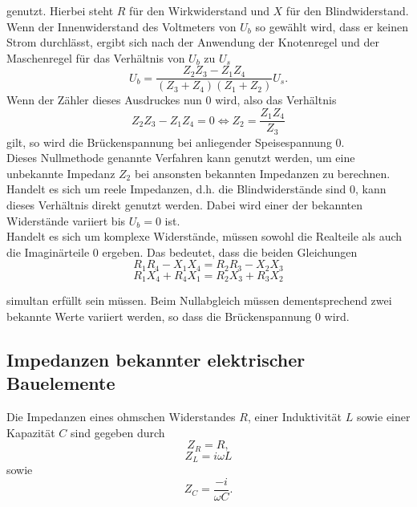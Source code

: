 genutzt.
Hierbei steht $R$ für den Wirkwiderstand und $X$ für den Blindwiderstand. \\
Wenn der Innenwiderstand des Voltmeters von $U_b$ so gewählt wird, dass er keinen Strom durchlässt, ergibt sich nach der Anwendung der Knotenregel und der Maschenregel für das Verhältnis von $U_b$ zu $U_s$
\begin{equation}
  U_b = \frac{Z_2 Z_3 - Z_1 Z_4}{(Z_3 + Z_4)(Z_1 + Z_2)}U_s.
\end{equation}
Wenn der Zähler dieses Ausdruckes nun 0 wird, also das Verhältnis
\begin{equation}
Z_2 Z_3 - Z_1 Z_4 = 0 \iff Z_2 = \frac{Z_1 Z_4}{Z_3} \label{eqn:1}
\end{equation}
gilt, so wird die Brückenspannung bei anliegender Speisespannung 0.\\
Dieses Nullmethode genannte Verfahren kann genutzt werden, um eine unbekannte Impedanz $Z_2$ bei ansonsten bekannten Impedanzen zu berechnen.
Handelt es sich um reele Impedanzen, d.h. die Blindwiderstände sind 0, kann dieses Verhältnis direkt genutzt werden.
Dabei wird einer der bekannten Widerstände variiert bis $U_b=0$ ist.\\
Handelt es sich um komplexe Widerstände, müssen sowohl die Realteile als auch die Imaginärteile 0 ergeben.
Das bedeutet, dass die beiden Gleichungen
\begin{equation}
  R_1 R_4 - X_1 X_4 = R_2 R_3 - X_2 X_3
  \label{eqn:bed1}
\end{equation}
\begin{equation}
  R_1 X_4 + R_4 X_1 = R_2 X_3 + R_3 X_2
  \label{eqn:bed2}
\end{equation}

simultan erfüllt sein müssen.
Beim Nullabgleich müssen dementsprechend zwei bekannte Werte variiert werden, so dass die Brückenspannung 0 wird.
\subsection{Impedanzen bekannter elektrischer Bauelemente}
Die Impedanzen eines ohmschen Widerstandes $R$, einer Induktivität $L$ sowie einer Kapazität $C$ sind gegeben durch
\begin{equation}
  Z_R = R,
\end{equation}
\begin{equation}
  Z_L = i \omega L
\end{equation}
sowie
\begin{equation}
  Z_C = \frac{-i}{\omega C}.
\end{equation}\cite{sample}
\newpage
